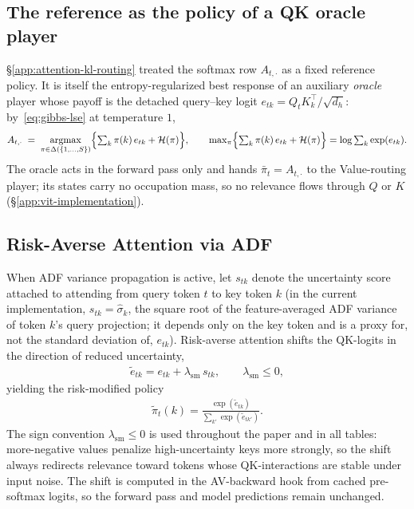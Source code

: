\documentclass[twoside]{article}
\newcommand{\1}{\mathbf{1}}
\DeclareMathOperator{\argmax}{argmax}
\begin{document}
\subsection{The reference as the policy of a QK oracle player}\label{app:attention-oracle}

\S\ref{app:attention-kl-routing} treated the softmax row $A_{t,\cdot}$ as a fixed reference policy.
It is itself the entropy-regularized best response of an auxiliary \emph{oracle} player whose
payoff is the detached query--key logit $e_{tk} = Q_t K_k^\top/\sqrt{d_h}$: by~\eqref{eq:gibbs-lse}
at temperature $1$,
\begin{align}\label{eq:attn-qk-oracle}
    A_{t,\cdot} \;=\; \argmax_{\pi \in \Delta(\{1,\dots,S\})} \Bigl\{ \textstyle\sum_{k} \pi(k)\,
    e_{tk} + \mathcal{H}(\pi) \Bigr\},
    \qquad
    \max_{\pi} \Bigl\{ \textstyle\sum_{k} \pi(k)\, e_{tk} + \mathcal{H}(\pi) \Bigr\} = \log
    \textstyle\sum_{k} \exp(e_{tk}).
\end{align}
The oracle acts in the forward pass only and hands $\bar\pi_t = A_{t,\cdot}$ to the Value-routing
player; its states carry no occupation mass, so no relevance flows through $Q$ or $K$
(\S\ref{app:vit-implementation}).

\subsection{Risk-Averse Attention via ADF}\label{app:risk-attn}

When \ac{ADF} variance propagation is active, let $s_{tk}$ denote the uncertainty score attached to
attending from query token $t$ to key token $k$ (in the current implementation, $s_{tk} =
    \hat{\sigma}_k$, the square root of the feature-averaged \ac{ADF} variance of token $k$'s query
projection; it depends only on the key token and is a proxy for, not the standard deviation of,
$e_{tk}$). Risk-averse attention shifts the QK-logits in the direction of reduced uncertainty,
\begin{align}\label{eq:risk-attn-policy}
    \tilde e_{tk} = e_{tk} + \lambda_{\mathrm{sm}}\, s_{tk},
    \qquad \lambda_{\mathrm{sm}} \le 0,
\end{align}
yielding the risk-modified policy
\begin{align}\label{eq:risk-attn-policy-softmax}
    \tilde{\pi}_t(k) = \frac{\exp(\tilde e_{tk})}{\sum_{k'} \exp(\tilde e_{tk'})}.
\end{align}
The sign convention $\lambda_{\mathrm{sm}} \le 0$ is used throughout the paper and in all tables:
more-negative values penalize high-uncertainty keys more strongly, so the shift always redirects
relevance toward tokens whose QK-interactions are stable under input noise. The shift is computed
in the AV-backward hook from cached pre-softmax logits, so the forward pass and model predictions
remain unchanged.
\end{document}
